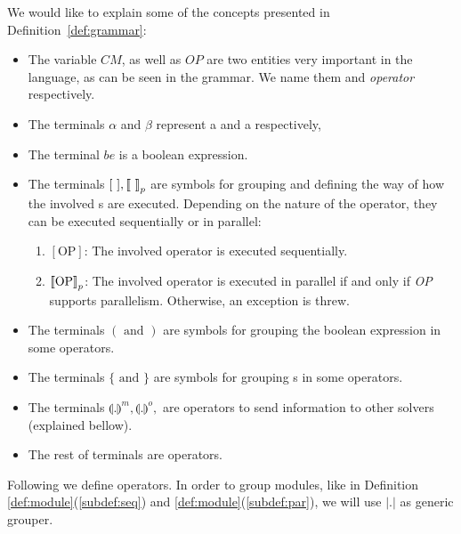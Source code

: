 We would like to explain some of the concepts presented in Definition~\ref{def:grammar}: 
\begin{itemize}
	\item The variable $CM$, as well as $OP$ are two entities very important in the language, as can be seen in the grammar. We name them \cm{} and {\it operator} respectively.
	\item The terminals $\alpha$ and $\beta$ represent a \om{} and a \opch{} respectively,
	\item The terminal $be$ is a boolean expression.
	\item The terminals $[\text{ } ], \left\llbracket\text{ } \right\rrbracket_p$ are symbols for grouping and defining the way of how the involved \cm s are executed. Depending on the nature of the operator, they can be executed sequentially or in parallel:
	\begin{enumerate}\renewcommand{\labelitemi}{\scriptsize$\blacksquare$}
		\item $\left[\text{OP}\right]$: The involved operator is executed sequentially.
		\item $\left\llbracket\text{OP}\right\rrbracket_p$: The involved operator is executed in parallel if and only if \emph{OP} supports parallelism. Otherwise, an exception is threw.
	\end{enumerate}
	\item The terminals $(\text{ and })$ are symbols for grouping the boolean expression in some operators.
	\item The terminals $\{\text{ and } \}$ are symbols for grouping \cm s in some operators.
	\item The terminals $\llparenthesis. \rrparenthesis^m, \llparenthesis.\rrparenthesis^o,$ are operators to send information to other solvers (explained bellow).
	\item The rest of terminals are \posl{} operators.
\end{itemize}

Following we define \posl{} operators. In order to group modules, like in Definition \ref{def:module}(\ref{subdef:seq}) and \ref{def:module}(\ref{subdef:par}), we will use $\left|.\right|$ as generic grouper.



